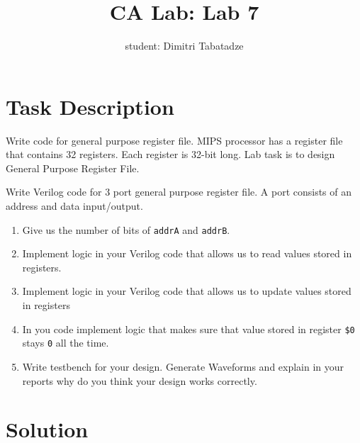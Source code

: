 \documentclass{article}
\title{CA Lab: Lab 7}
\author{student: Dimitri Tabatadze}
\begin{document}
    \maketitle

    \section*{Task Description} 
    
    Write code for general purpose register file. MIPS processor has a register file that contains 32 registers. Each register is 32-bit long. Lab task is to design General Purpose Register File.

    Write Verilog code for 3 port general purpose register file. A port consists of an address and data input/output.

    \begin{enumerate}
        \item Give us the number of bits of \verb|addrA| and \verb|addrB|.
        \item Implement logic in your Verilog code that allows us to read values stored in registers.
        \item Implement logic in your Verilog code that allows us to update values stored in registers
        \item  In you code implement logic that makes sure that value stored in register \verb|$0| stays \verb|0| all the time.
        \item Write testbench for your design. Generate Waveforms and explain in your reports why do you think your design works correctly.
    \end{enumerate}

    \section*{Solution}
\end{document}
